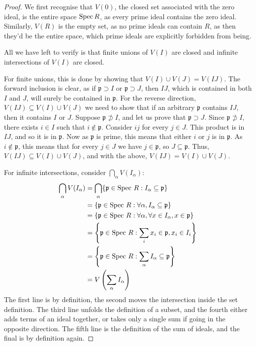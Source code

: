 \begin{proof}
    We first recognise that $V(0)$, the closed set associated with the zero ideal, is the entire space $\operatorname{Spec} R$, as every prime ideal contains the zero ideal. Similarly, $V(R)$ is the empty set, as no prime ideals can contain $R$, as then they'd be the entire space, which prime ideals are explicitly forbidden from being.

    All we have left to verify is that finite unions of $V(I)$ are closed and infinite intersections of $V(I)$ are closed.

    For finite unions, this is done by showing that $V(I) \cup V(J) = V(IJ)$. The forward inclusion is clear, as if $\mathfrak{p} \supset I$ or $\mathfrak{p} \supset J$, then $IJ$, which is contained in both $I$ and $J$, will surely be contained in $\mathfrak{p}$.
    For the reverse direction, $V(IJ) \subseteq V(I) \cup V(J)$ we need to show that if an arbitrary $\mathfrak{p}$ contains $IJ$, then it contains $I$ or $J$.
    Suppose \(\mathfrak{p} \not \supset I\), and let us prove that \(\mathfrak{p} \supset J\).
    Since \(\mathfrak{p} \not \supset I\), there exists \(i \in I\) such that \(i \not \in \mathfrak{p}\).
    Consider $ij$ for every $j \in J$. This product is in $IJ$, and so it is in $\mathfrak{p}$. Now as $\mathfrak{p}$ is prime, this means that either $i$ or $j$ is in $\mathfrak{p}$. As $i \notin \mathfrak{p}$, this means that for every $j \in J$ we have $j \in \mathfrak{p}$, so $J \subseteq \mathfrak{p}$. Thus, $V(IJ) \subseteq V(I) \cup V(J)$, and with the above, $V(IJ) = V(I) \cup V(J)$.
    
    For infinite intersections, consider $\bigcap_\alpha V(I_\alpha)$:
    \begin{align*}
        \bigcap_\alpha V(I_\alpha) &= \bigcap_\alpha \{ \mathfrak{p} \in \operatorname{Spec} \,R : I_\alpha \subseteq \mathfrak{p} \} \\
        &= \{ \mathfrak{p} \in \operatorname{Spec} \,R : \forall \alpha, I_\alpha \subseteq \mathfrak{p} \} \\
        &= \{ \mathfrak{p} \in \operatorname{Spec} \,R : \forall \alpha, \forall x \in  I_\alpha, x \in \mathfrak{p} \} \\
        &= \left\{ \mathfrak{p} \in \operatorname{Spec} \,R : \sum_i  x_i \in \mathfrak{p}, x_i \in I_i \right\} \\
        &= \left\{ \mathfrak{p} \in \operatorname{Spec} \,R : \sum_\alpha I_\alpha \subseteq \mathfrak{p} \right\} \\
        &= V\left(\sum_\alpha I_\alpha\right)
    \end{align*}
    The first line is by definition, the second moves the intersection inside the set definition. The third line unfolds the definition of a subset, and the fourth either adds terms of an ideal together, or takes only a single sum if going in the opposite direction. The fifth line is the definition of the sum of ideals, and the final is by definition again.
\end{proof}
